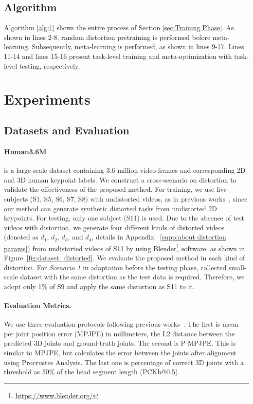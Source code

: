     \subsection{Algorithm}
        \vspace{-1mm}
        Algorithm \ref{alg:1} shows the entire process of Section \ref{sec:Training Phase}. As shown in lines 2-8, random distortion pretraining is performed before meta-learning. Subsequently, meta-learning is performed, as shown in lines 9-17. Lines 11-14 and lines 15-16 present task-level training and meta-optimization with task-level testing, respectively.
        \vspace{-1mm}


\section{Experiments}
\subsection{Datasets and Evaluation}
    \label{exp:datasets and evaluation}
    \paragraph{Human3.6M~\cite{ref19_6682899}} is a large-scale dataset containing 3.6 million video frames and corresponding 2D and 3D human keypoint labels. We construct a cross-scenario on distortion to validate the effectiveness of the proposed method. For training, we use five subjects (S1, S5, S6, S7, S8) with undistorted videos, as in previous works~\cite{ref9_pavllo20193d,ref11_anatomy3D}, since our method can generate synthetic distorted tasks from undistorted 2D keypoints. For testing, only one subject (S11) is used. Due to the absence of test videos with distortion, we generate four different kinds of distorted videos (denoted as $d_1$, $d_2$, $d_3$, and $d_4$, details in Appendix ~\ref{supp:about distortion params}) from undistorted videos of S11 by using Blender\footnote{\url{https://www.blender.org/}} software, as shown in Figure~\ref{fig:dataset_distorted}. We evaluate the proposed method in each kind of distortion. For \textit{Scenario 1} in adaptation before the testing phase, collected small-scale dataset with the same distortion as the test data is required. Therefore, we adopt only 1\% of S9 and apply the same distortion as S11 to it.
    \vspace{-3mm}
    
    \paragraph{Evaluation Metrics.}
        We use three evaluation protocols following previous works~\cite{ref7_martinez2017simple,ref8_zhao2019semantic,ref9_pavllo20193d,ref11_anatomy3D,ref12_liu2020attention,ref18_ISO_NeurIPS2020}. The first is mean per joint position error (MPJPE) in millimeters, the L2 distance between the predicted 3D joints and ground-truth joints. The second is P-MPJPE. This is similar to MPJPE, but calculates the error between the joints after alignment using Procrustes Analysis. The last one is percentage of correct 3D joints with a threshold as 50\% of the head segment length (PCKh@0.5).


